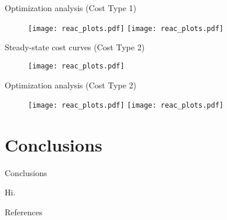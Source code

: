 \documentclass[xcolor=dvipsnames, 8pt]{beamer} %
\begin{document}
\begin{frame}{Optimization analysis (Cost Type 1)}

\begin{figure}
	\centering
	\texttt{[image: reac\_plots.pdf]}
	\texttt{[image: reac\_plots.pdf]}
\end{figure}

\end{frame}

\begin{frame}{Steady-state cost curves (Cost Type 2)}

	\begin{figure}
		\centering
		\texttt{[image: reac\_plots.pdf]}
	\end{figure}

\end{frame}

\begin{frame}{Optimization analysis (Cost Type 2)}

\begin{figure}
	\centering
	\texttt{[image: reac\_plots.pdf]}
	\texttt{[image: reac\_plots.pdf]}
\end{figure}

\end{frame}

\section{Conclusions}
\begin{frame}{Conclusions}

	Hi.

\end{frame}

\begin{frame}{References}


\end{frame}
\end{document}
